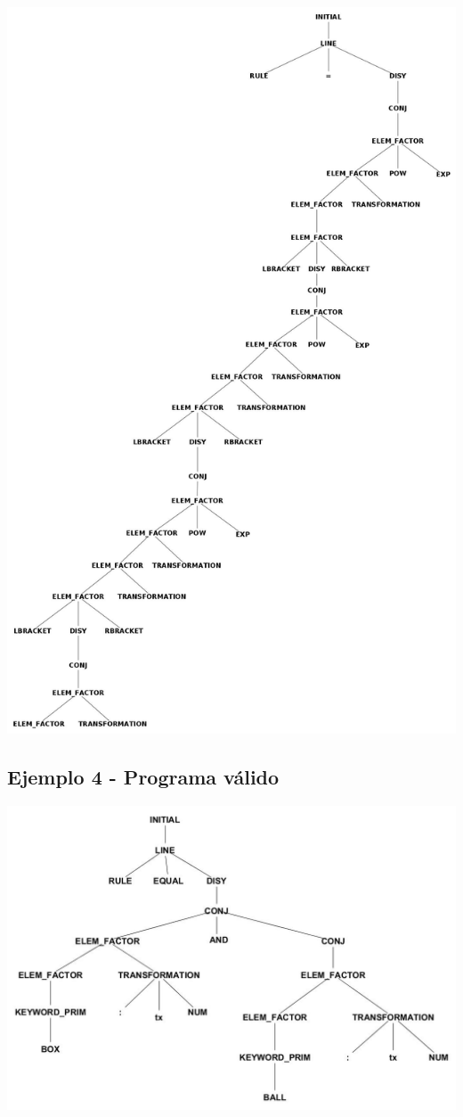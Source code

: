 \centerline{\includegraphics[scale=0.40]{arboles_derivacion/cube1.jpg}}


\subsection{Ejemplo 4 - Programa v\'alido}

\centerline{\includegraphics[scale=0.40]{arboles_derivacion/Ejemplo_and1.jpg}}

